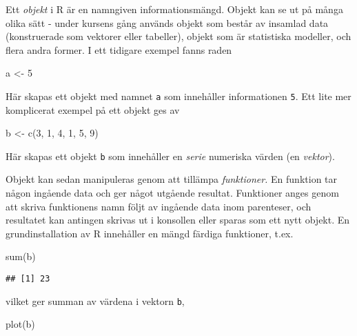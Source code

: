 \documentclass[
]{book}
\newenvironment{Shaded}{\begin{snugshade}}{\end{snugshade}}
\newcommand{\DecValTok}[1]{\textcolor[rgb]{0.00,0.00,0.81}{#1}}
\newcommand{\FunctionTok}[1]{\textcolor[rgb]{0.00,0.00,0.00}{#1}}
\newcommand{\NormalTok}[1]{#1}
\newcommand{\OtherTok}[1]{\textcolor[rgb]{0.56,0.35,0.01}{#1}}
\theoremstyle{definition}
\theoremstyle{definition}
\theoremstyle{definition}
\theoremstyle{definition}
\theoremstyle{remark}
\begin{document}
Ett \emph{objekt} i R är en namngiven informationsmängd. Objekt kan se ut på många olika sätt - under kursens gång används objekt som består av insamlad data (konstruerade som vektorer eller tabeller), objekt som är statistiska modeller, och flera andra former. I ett tidigare exempel fanns raden

\begin{Shaded}
\begin{Highlighting}[]
\NormalTok{a }\OtherTok{\textless{}{-}} \DecValTok{5}
\end{Highlighting}
\end{Shaded}

Här skapas ett objekt med namnet \texttt{a} som innehåller informationen \texttt{5}.
Ett lite mer komplicerat exempel på ett objekt ges av

\begin{Shaded}
\begin{Highlighting}[]
\NormalTok{b }\OtherTok{\textless{}{-}} \FunctionTok{c}\NormalTok{(}\DecValTok{3}\NormalTok{, }\DecValTok{1}\NormalTok{, }\DecValTok{4}\NormalTok{, }\DecValTok{1}\NormalTok{, }\DecValTok{5}\NormalTok{, }\DecValTok{9}\NormalTok{)}
\end{Highlighting}
\end{Shaded}

Här skapas ett objekt \texttt{b} som innehåller en \emph{serie} numeriska värden (en \emph{vektor}).

Objekt kan sedan manipuleras genom att tillämpa \emph{funktioner.} En funktion tar någon ingående data och ger något utgående resultat. Funktioner anges genom att skriva funktionens namn följt av ingående data inom parenteser, och resultatet kan antingen skrivas ut i konsollen eller sparas som ett nytt objekt. En grundinstallation av R innehåller en mängd färdiga funktioner, t.ex.

\begin{Shaded}
\begin{Highlighting}[]
\FunctionTok{sum}\NormalTok{(b)}
\end{Highlighting}
\end{Shaded}

\begin{verbatim}
## [1] 23
\end{verbatim}

vilket ger summan av värdena i vektorn \texttt{b},

\begin{Shaded}
\begin{Highlighting}[]
\FunctionTok{plot}\NormalTok{(b)}
\end{Highlighting}
\end{Shaded}
\end{document}
